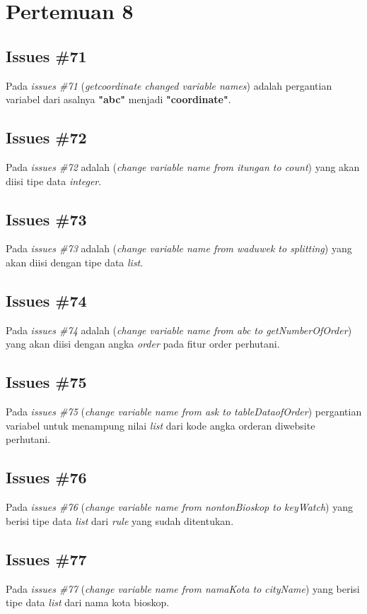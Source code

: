 \chapter{Pertemuan 8}

\section{Issues \#71}
Pada \textit{issues \#71} (\textit{getcoordinate changed variable names}) adalah pergantian variabel dari asalnya \textbf{"abc"} menjadi \textbf{"coordinate"}.

\section{Issues \#72}
Pada \textit{issues \#72} adalah (\textit{change variable name from itungan to count}) yang akan diisi tipe data \textit{integer}.

\section{Issues \#73}
Pada \textit{issues \#73} adalah (\textit{change variable name from waduwek to splitting}) yang akan diisi dengan tipe data \textit{list}.

\section{Issues \#74}
Pada \textit{issues \#74} adalah (\textit{change variable name from abc to getNumberOfOrder}) yang akan diisi dengan angka \textit{order} pada fitur order perhutani.

\section{Issues \#75}
Pada \textit{issues \#75} (\textit{change variable name from ask to tableDataofOrder}) pergantian variabel untuk menampung nilai \textit{list} dari kode angka orderan diwebsite perhutani.

\section{Issues \#76}
Pada \textit{issues \#76} (\textit{change variable name from nontonBioskop to keyWatch}) yang berisi tipe data \textit{list} dari \textit{rule} yang sudah ditentukan.

\section{Issues \#77}
Pada \textit{issues \#77} (\textit{change variable name from namaKota to cityName}) yang berisi tipe data \textit{list} dari nama kota bioskop.

